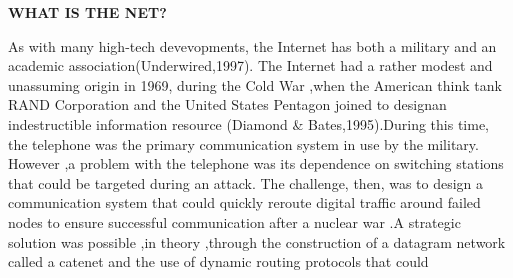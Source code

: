 \documentclass{book} %
\begin{document}
\noindent \begin{flushleft}
\textbf{WHAT IS THE NET?}

\noindent \textbf{}

\noindent As with many high-tech devevopments, the Internet has both a military and an academic association(Underwired,1997). The Internet had a rather modest and unassuming origin in 1969, during the Cold War ,when the American think tank RAND Corporation and the United States Pentagon joined to designan indestructible information resource (Diamond \& Bates,1995).During this time, the telephone was the primary communication system in use by the military. However ,a problem with the telephone was its dependence on switching stations that could be targeted during an attack. The challenge, then, was to design a communication system that could quickly reroute digital traffic around failed nodes to ensure successful communication after a nuclear war .A strategic solution was possible ,in theory ,through the construction of a datagram network called a catenet and the use of dynamic routing protocols that could

\noindent 
\end{flushleft}
\end{document}
